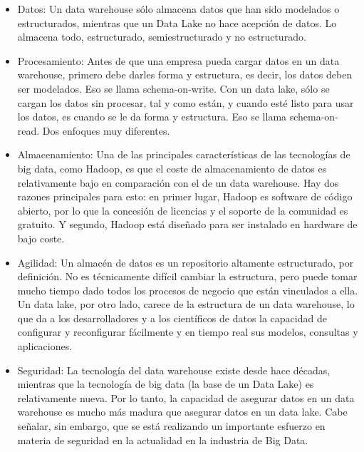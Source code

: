 \documentclass[11pt,a4paper]{article}
\begin{document}
		\begin{itemize}
			
			\item Datos: Un data warehouse sólo almacena datos que han sido modelados o estructurados, mientras que un Data Lake no hace acepción de datos. Lo almacena todo, estructurado, semiestructurado y no estructurado.

			\item Procesamiento: Antes de que una empresa pueda cargar datos en un data warehouse, primero debe darles forma y estructura, es decir, los datos deben ser modelados. Eso se llama schema-on-write. Con un data lake, sólo se cargan los datos sin procesar, tal y como están, y cuando esté listo para usar los datos, es cuando se le da forma y estructura. Eso se llama schema-on-read. Dos enfoques muy diferentes.

			\item Almacenamiento: Una de las principales características de las tecnologías de big data, como Hadoop, es que el coste de almacenamiento de datos es relativamente bajo en comparación con el de un data warehouse. Hay dos razones principales para esto: en primer lugar, Hadoop es software de código abierto, por lo que la concesión de licencias y el soporte de la comunidad es gratuito. Y segundo, Hadoop está diseñado para ser instalado en hardware de bajo coste.

			\item Agilidad: Un almacén de datos es un repositorio altamente estructurado, por definición. No es técnicamente difícil cambiar la estructura, pero puede tomar mucho tiempo dado todos los procesos de negocio que están vinculados a ella. Un data lake, por otro lado, carece de la estructura de un data warehouse, lo que da a los desarrolladores y a los científicos de datos la capacidad de configurar y reconfigurar fácilmente y en tiempo real sus modelos, consultas y aplicaciones.

			\item Seguridad: La tecnología del data warehouse existe desde hace décadas, mientras que la tecnología de big data (la base de un Data Lake) es relativamente nueva. Por lo tanto, la capacidad de asegurar datos en un data warehouse es mucho más madura que asegurar datos en un data lake. Cabe señalar, sin embargo, que se está realizando un importante esfuerzo en materia de seguridad en la actualidad en la industria de Big Data. \cite{DWarehouseVsDLake02:Online}
		\end{itemize}
					
				
			
			

		
		
		\newpage

		
		
		
	
\end{document}
